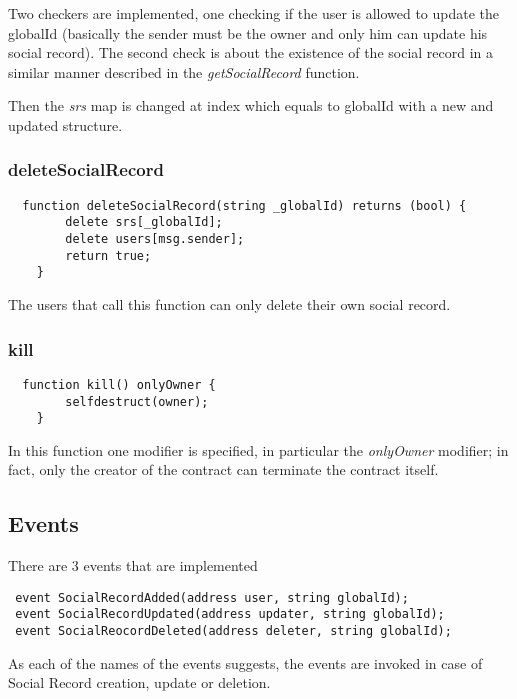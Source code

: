 Two checkers are implemented, one checking if the user is allowed to update the globalId (basically the sender must be the owner and only him can update his social record).
The second check is about the existence of the social record in a similar manner described  in the \textit{getSocialRecord} function.

Then the \textit{srs} map is changed at index which equals to globalId with a new and updated structure.

\subsubsection{deleteSocialRecord}
\begin{lstlisting}
  function deleteSocialRecord(string _globalId) returns (bool) {
        delete srs[_globalId];
        delete users[msg.sender];
        return true;
    }
\end{lstlisting}
The users that call this function can only delete their own social record.

\subsubsection{kill}
\begin{lstlisting}
  function kill() onlyOwner {
        selfdestruct(owner);
    }
\end{lstlisting}
In this function one modifier is specified, in particular the \textit{onlyOwner} modifier; in fact, only the creator of the contract can terminate the contract itself.

\subsection{Events}
There are 3 events that are implemented
\begin{lstlisting}
 event SocialRecordAdded(address user, string globalId);
 event SocialRecordUpdated(address updater, string globalId);
 event SocialReocordDeleted(address deleter, string globalId);
\end{lstlisting}
As each of the names of the events suggests, the events are invoked in case of Social Record creation, update or deletion.
